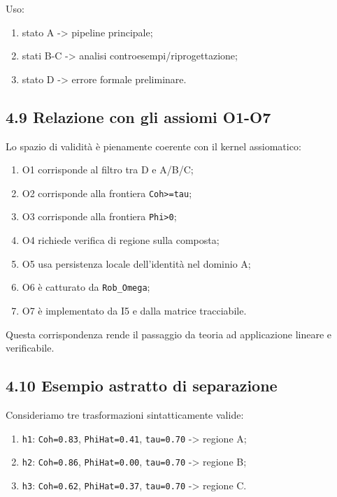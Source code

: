 Uso:

\begin{enumerate}
\def\labelenumi{\arabic{enumi}.}
\tightlist
\item
  stato A -\textgreater{} pipeline principale;
\item
  stati B-C -\textgreater{} analisi controesempi/riprogettazione;
\item
  stato D -\textgreater{} errore formale preliminare.
\end{enumerate}

\subsection{4.9 Relazione con gli assiomi O1-O7}

Lo spazio di validità è pienamente coerente con il kernel assiomatico:

\begin{enumerate}
\def\labelenumi{\arabic{enumi}.}
\tightlist
\item
  O1 corrisponde al filtro tra D e A/B/C;
\item
  O2 corrisponde alla frontiera \texttt{Coh\textgreater{}=tau};
\item
  O3 corrisponde alla frontiera \texttt{Phi\textgreater{}0};
\item
  O4 richiede verifica di regione sulla composta;
\item
  O5 usa persistenza locale dell'identità nel dominio A;
\item
  O6 è catturato da \texttt{Rob\_Omega};
\item
  O7 è implementato da I5 e dalla matrice tracciabile.
\end{enumerate}

Questa corrispondenza rende il passaggio da teoria ad applicazione lineare e verificabile.

\subsection{4.10 Esempio astratto di separazione}

Consideriamo tre trasformazioni sintatticamente valide:

\begin{enumerate}
\def\labelenumi{\arabic{enumi}.}
\tightlist
\item
  \texttt{h1}: \texttt{Coh=0.83}, \texttt{PhiHat=0.41}, \texttt{tau=0.70} -\textgreater{} regione A;
\item
  \texttt{h2}: \texttt{Coh=0.86}, \texttt{PhiHat=0.00}, \texttt{tau=0.70} -\textgreater{} regione B;
\item
  \texttt{h3}: \texttt{Coh=0.62}, \texttt{PhiHat=0.37}, \texttt{tau=0.70} -\textgreater{} regione C.
\end{enumerate}

